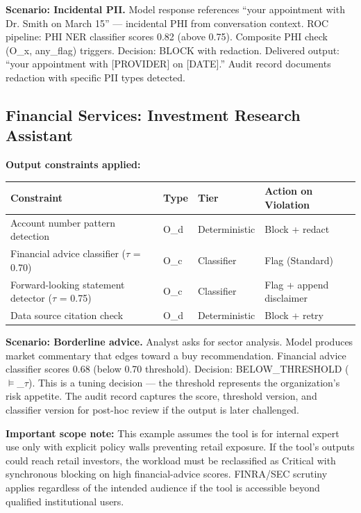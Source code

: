 \textbf{Scenario: Incidental PII.} Model response references ``your appointment with Dr. Smith on March 15'' --- incidental PHI from conversation context. ROC pipeline: PHI NER classifier scores 0.82 (above 0.75). Composite PHI check (O\_\allowbreak{}x, any\_\allowbreak{}flag) triggers. Decision: BLOCK with redaction. Delivered output: ``your appointment with [PROVIDER] on [DATE].'' Audit record documents redaction with specific PII types detected.

\subsection{Financial Services: Investment Research Assistant}
\label{sec:clad-examples-B-2-2}


\textbf{Output constraints applied:}

\begin{table}[ht]
  \centering\small
  \begin{tabular}{@{}>{\raggedright\arraybackslash}p{7.06cm}>{\raggedright\arraybackslash}p{1.13cm}>{\raggedright\arraybackslash}p{2.04cm}>{\raggedright\arraybackslash}p{3.77cm}@{}}
  \toprule
  Constraint & Type & Tier & Action on Violation \\
  \midrule
  Account number pattern detection & O\_\allowbreak{}d & Deterministic & Block + redact \\
  Financial advice classifier ($\tau$ = 0.70) & O\_\allowbreak{}c & Classifier & Flag (Standard) \\
  Forward-looking statement detector ($\tau$ = 0.75) & O\_\allowbreak{}c & Classifier & Flag + append disclaimer \\
  Data source citation check & O\_\allowbreak{}d & Deterministic & Block + retry \\
  \bottomrule
  \end{tabular}
\end{table}


\textbf{Scenario: Borderline advice.} Analyst asks for sector analysis. Model produces market commentary that edges toward a buy recommendation. Financial advice classifier scores 0.68 (below 0.70 threshold). Decision: BELOW\_\allowbreak{}THRESHOLD ($\vDash$\_\allowbreak{}$\tau$). This is a tuning decision --- the threshold represents the organization's risk appetite. The audit record captures the score, threshold version, and classifier version for post-hoc review if the output is later challenged.

\textbf{Important scope note:} This example assumes the tool is for internal expert use only with explicit policy walls preventing retail exposure. If the tool's outputs could reach retail investors, the workload must be reclassified as Critical with synchronous blocking on high financial-advice scores. FINRA/SEC scrutiny applies regardless of the intended audience if the tool is accessible beyond qualified institutional users.

